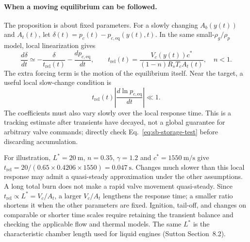 \paragraph{When a moving equilibrium can be followed.}
The proposition is about fixed parameters. For a slowly changing
$A_b(y(t))$ and $A_t(t)$, let
$\delta(t)=p_c(t)-p_{c,\mathrm{eq}}(y(t),t)$.
In the same small-$\rho_g/\rho_p$ model, local linearization gives
\[
 \frac{d\delta}{dt}
 \simeq-\frac{\delta}{t_{\mathrm{rel}}(t)}
       -\frac{dp_{c,\mathrm{eq}}}{dt},\qquad
 t_{\mathrm{rel}}(t)=\frac{V_c(y(t))c^*}{(1-n)R_sT_cA_t(t)},\quad n<1.
\]
The extra forcing term is the motion of the equilibrium itself.
Near the target, a useful local slow-change condition is
\begin{equation}\label{eq:sb-tracking-condition}
 t_{\mathrm{rel}}(t)\left|\frac{d\ln p_{c,\mathrm{eq}}}{dt}\right|\ll1.
\end{equation}
The coefficients must also vary slowly over the local response time.
This is a tracking estimate after transients have decayed, not a
global guarantee for arbitrary valve commands; directly check
Eq.~\eqref{eq:sb-storage-test} before discarding accumulation.

For illustration, $L^*=20\ \mathrm m$, $n=0.35$, $\gamma=1.2$ and
$c^*=1550\ \mathrm{m/s}$ give
$t_{\mathrm{rel}}=20/(0.65\times0.4206\times1550)=0.047\ \mathrm s$.
Changes much slower than this local response may admit a quasi-steady
approximation under the other assumptions. A long total burn does
not make a rapid valve movement quasi-steady. Since
$t_{\mathrm{rel}}\propto L^*=V_c/A_t$, a larger $V_c/A_t$ lengthens the response
time; a smaller ratio shortens it when the other parameters are fixed.
Ignition, tail-off, and changes on comparable or shorter time scales
require retaining the transient balance and checking the applicable
flow and thermal models. The same $L^*$ is the characteristic
chamber length used for liquid engines (Sutton Section~8.2).

